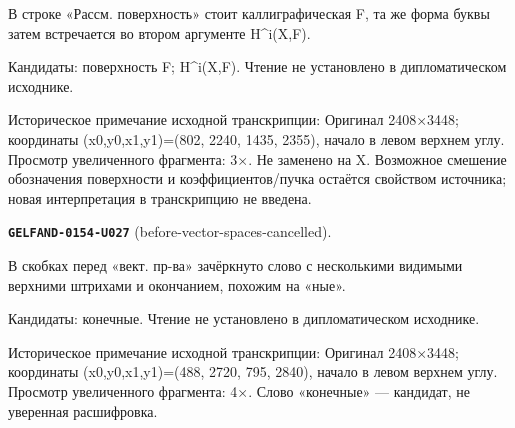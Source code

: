 В строке «Рассм. поверхность» стоит каллиграфическая F, та же форма буквы затем встречается во втором аргументе H\textasciicircum{}i(X,F).\par
Кандидаты: поверхность F; H\textasciicircum{}i(X,F). Чтение не установлено в дипломатическом исходнике.\par
Историческое примечание исходной транскрипции: Оригинал 2408×3448; координаты (x0,y0,x1,y1)=(802, 2240, 1435, 2355), начало в левом верхнем углу. Просмотр увеличенного фрагмента: 3×. Не заменено на X. Возможное смешение обозначения поверхности и коэффициентов/пучка остаётся свойством источника; новая интерпретация в транскрипцию не введена.\par\medskip
\par\noindent\leavevmode{}\label{GELFAND-0154-U027}\textbf{\texttt{GELFAND-0154-U027}} (before-vector-spaces-cancelled).\nopagebreak[4]\par
В скобках перед «вект. пр-ва» зачёркнуто слово с несколькими видимыми верхними штрихами и окончанием, похожим на «ные».\par
Кандидаты: конечные. Чтение не установлено в дипломатическом исходнике.\par
Историческое примечание исходной транскрипции: Оригинал 2408×3448; координаты (x0,y0,x1,y1)=(488, 2720, 795, 2840), начало в левом верхнем углу. Просмотр увеличенного фрагмента: 4×. Слово «конечные» — кандидат, не уверенная расшифровка.\par\medskip
